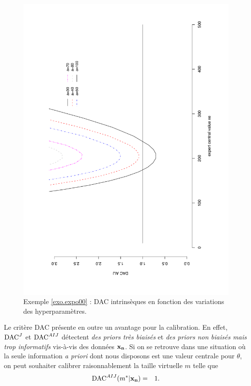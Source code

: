 \begin{figure}[h!]
     \includegraphics[scale=0.4,angle=270]{figures/critics/expograph2DACAIJ.pdf}
    \caption{Exemple \ref{exo.expo00} : DAC intrinsèques en fonction des variations des hyperparamètres.}
    \label{expograph}
\end{figure}


\noindent Le critère DAC présente en outre un avantage pour la calibration. En effet, $\mbox{DAC}^J$ et $\mbox{DAC}^{AIJ}$ détectent \emph{\it des priors très biaisés} et \emph{\it
des priors non biaisés mais trop informatifs} vis-à-vis des données ${\bf x_n}$. Si on se retrouve dans une situation où la seule information {\it a priori} dont nous disposons est une valeur centrale pour $\theta$, on peut souhaiter calibrer raisonnablement la taille virtuelle $m$ telle que
\begin{eqnarray*}
\mbox{DAC}^{AIJ}(m^*|{\bf x_n})  &  = & 1.
\end{eqnarray*}

